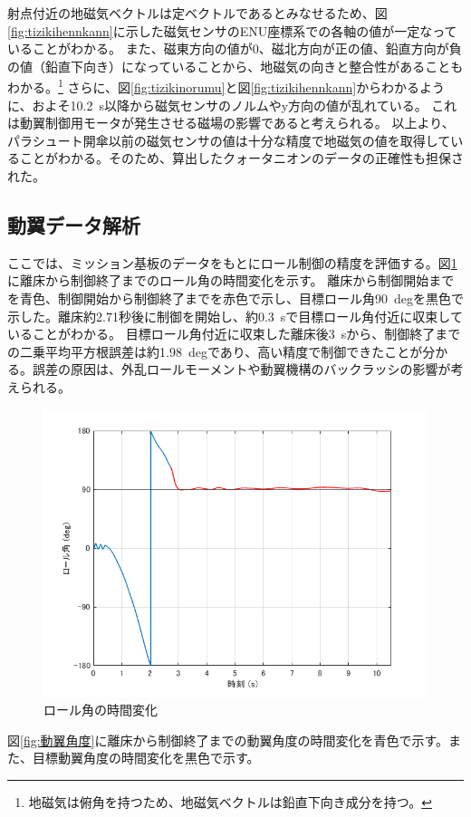 \documentclass[a4paper,11pt,uplatex]{jsarticle}
\begin{document}
射点付近の地磁気ベクトルは定ベクトルであるとみなせるため、図\ref{fig:tizikihennkann}に示した磁気センサのENU座標系での各軸の値が一定なっていることがわかる。
また、磁東方向の値が$0$、磁北方向が正の値、鉛直方向が負の値（鉛直下向き）になっていることから、地磁気の向きと整合性があることもわかる。\footnote{地磁気は俯角を持つため、地磁気ベクトルは鉛直下向き成分を持つ。}
さらに、図\ref{fig:tizikinorumu}と図\ref{fig:tizikihennkann}からわかるように、およそ\SI{10.2}{s}以降から磁気センサのノルムやy方向の値が乱れている。
これは動翼制御用モータが発生させる磁場の影響であると考えられる。
以上より、パラシュート開傘以前の磁気センサの値は十分な精度で地磁気の値を取得していることがわかる。そのため、算出したクォータニオンのデータの正確性も担保された。

\subsection{動翼データ解析}
\label{sc:data_doyoku}
ここでは、ミッション基板のデータをもとにロール制御の精度を評価する。図\ref{fig:ロール角}に離床から制御終了までのロール角の時間変化を示す。
離床から制御開始までを青色、制御開始から制御終了までを赤色で示し、目標ロール角\SI{90}{deg}を黒色で示した。離床約2.71秒後に制御を開始し、約\SI{0.3}{s}で目標ロール角付近に収束していることがわかる。
目標ロール角付近に収束した離床後\SI{3}{s}から、制御終了までの二乗平均平方根誤差は約\SI{1.98}{deg}であり、高い精度で制御できたことが分かる。誤差の原因は、外乱ロールモーメントや動翼機構のバックラッシの影響が考えられる。\par
\begin{figure}[H]
	\centering
	\includegraphics[width=0.8\linewidth]{pic_avi/ロール角.png}
	\caption{ロール角の時間変化}
	\label{fig:ロール角}
\end{figure}
図\ref{fig:動翼角度}に離床から制御終了までの動翼角度の時間変化を青色で示す。また、目標動翼角度の時間変化を黒色で示す。
\end{document}
